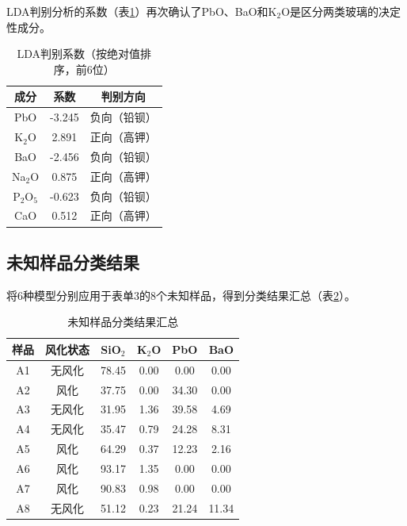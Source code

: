 \documentclass[12pt,a4paper]{ctexart}
\begin{document}
LDA判别分析的系数（表\ref{tab:lda_coef}）再次确认了PbO、BaO和K$_2$O是区分两类玻璃的决定性成分。

\begin{table}[H]
\centering
\caption{LDA判别系数（按绝对值排序，前6位）}
\label{tab:lda_coef}
\begin{tabular}{ccc}
\toprule
\textbf{成分} & \textbf{系数} & \textbf{判别方向} \\
\midrule
PbO    & -3.245 & 负向（铅钡） \\
K$_2$O & 2.891  & 正向（高钾） \\
BaO    & -2.456 & 负向（铅钡） \\
Na$_2$O& 0.875  & 正向（高钾） \\
P$_2$O$_5$ & -0.623 & 负向（铅钡） \\
CaO    & 0.512  & 正向（高钾） \\
\bottomrule
\end{tabular}
\end{table}

\subsection{未知样品分类结果}

将6种模型分别应用于表单3的8个未知样品，得到分类结果汇总（表\ref{tab:unknown_results}）。

\begin{table}[H]
\centering
\caption{未知样品分类结果汇总}
\label{tab:unknown_results}
\begin{tabular}{cccccc}
\toprule
\textbf{样品} & \textbf{风化状态} & \textbf{SiO$_2$} & \textbf{K$_2$O} & \textbf{PbO} & \textbf{BaO} \\
\midrule
A1 & 无风化 & 78.45 & 0.00  & 0.00  & 0.00  \\
A2 & 风化   & 37.75 & 0.00  & 34.30 & 0.00  \\
A3 & 无风化 & 31.95 & 1.36  & 39.58 & 4.69  \\
A4 & 无风化 & 35.47 & 0.79  & 24.28 & 8.31  \\
A5 & 风化   & 64.29 & 0.37  & 12.23 & 2.16  \\
A6 & 风化   & 93.17 & 1.35  & 0.00  & 0.00  \\
A7 & 风化   & 90.83 & 0.98  & 0.00  & 0.00  \\
A8 & 无风化 & 51.12 & 0.23  & 21.24 & 11.34 \\
\bottomrule
\end{tabular}
\end{table}
\end{document}
